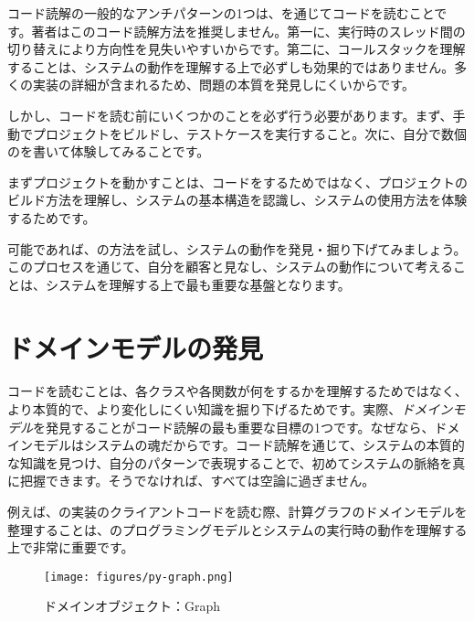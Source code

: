\begin{content}

コード読解の一般的なアンチパターンの1つは、を通じてコードを読むことです。著者はこのコード読解方法を推奨しません。第一に、実行時のスレッド間の切り替えにより方向性を見失いやすいからです。第二に、コールスタックを理解することは、システムの動作を理解する上で必ずしも効果的ではありません。多くの実装の詳細が含まれるため、問題の本質を発見しにくいからです。

しかし、コードを読む前にいくつかのことを必ず行う必要があります。まず、手動でプロジェクトをビルドし、テストケースを実行すること。次に、自分で数個のを書いて体験してみることです。

まずプロジェクトを動かすことは、コードをするためではなく、プロジェクトのビルド方法を理解し、システムの基本構造を認識し、システムの使用方法を体験するためです。

可能であれば、の方法を試し、システムの動作を発見・掘り下げてみましょう。このプロセスを通じて、自分を顧客と見なし、システムの動作について考えることは、システムを理解する上で最も重要な基盤となります。

\end{content}

\section{ドメインモデルの発見}

\begin{content}

コードを読むことは、各クラスや各関数が何をするかを理解するためではなく、より本質的で、より変化しにくい知識を掘り下げるためです。実際、\emph{ドメインモデル}を発見することがコード読解の最も重要な目標の1つです。なぜなら、ドメインモデルはシステムの魂だからです。コード読解を通じて、システムの本質的な知識を見つけ、自分のパターンで表現することで、初めてシステムの脈絡を真に把握できます。そうでなければ、すべては空論に過ぎません。

例えば、\tf{}の実装のクライアントコードを読む際、計算グラフのドメインモデルを整理することは、のプログラミングモデルとシステムの実行時の動作を理解する上で非常に重要です。

\begin{figure}[!htbp]
\centering
\texttt{[image: figures/py-graph.png]}
\caption{ドメインオブジェクト：Graph}
 \label{fig:py-graph}
\end{figure}

\end{content}

